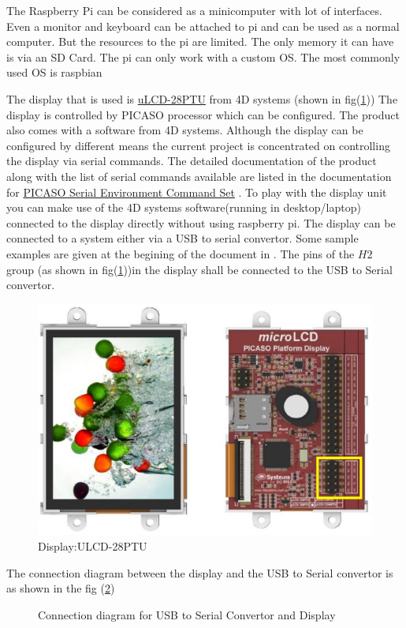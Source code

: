 \documentclass[12pt, a4paper, twoside]{article}
\begin{document}
The Raspberry Pi can be considered as a minicomputer with lot of interfaces. Even a monitor and keyboard can be attached to pi and can be used as a normal computer. But the resources to the pi are limited. The only memory it can have is via an SD Card. The pi can only work with a custom OS. The most commonly used OS is raspbian \cite{bib_raspbian}

The display that is used is \href{http://www.4dsystems.com.au/product/uLCD_28PTU/}{uLCD-28PTU} from 4D systems \cite{bib_ulcd} (shown in fig(\ref{fig_ulcd}))  The display is controlled by PICASO processor which can be configured. The product also comes with a software from 4D systems. Although the display can be configured by different means the current project is concentrated on controlling the display via serial commands. The detailed documentation of the product along with the list of serial commands available are listed in the documentation for \href{http://www.4dsystems.com.au/productpages/PICASO/downloads/PICASO_serialcmdmanual_R_2_0.pdf}{PICASO Serial Environment Command Set} \cite{bib_serulcd}. To play with the display unit you can make use of the 4D systems software(running in desktop/laptop) connected to the display directly without using raspberry pi. The display can be connected to a system either via a USB to serial convertor. Some sample examples are given at the begining of the document in \cite{bib_serulcd}. The pins of the $H2$ group (as shown in fig(\ref{fig_ulcd}))in the display shall be connected to the USB to Serial convertor.

\begin{figure}[ht]
    \centering
    \includegraphics[scale=0.7]{ulcd-28ptu.eps}
    \caption{Display:ULCD-28PTU}
    \label{fig_ulcd}
\end{figure}

The connection diagram between the display and the USB to Serial convertor is as shown in the fig (\ref{fig_convLcdCon})

\begin{figure}
	\centering
	\scalebox{0.7}{}
	\caption{Connection diagram for USB to Serial Convertor and Display}
	\label{fig_convLcdCon}
\end{figure}



 
\end{document}

